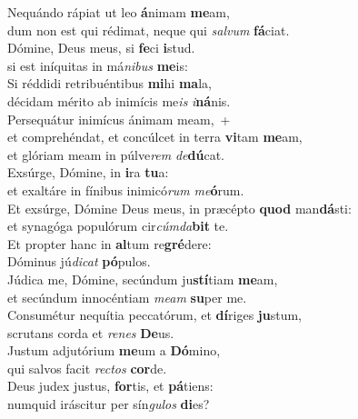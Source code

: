 \evenverse Nequándo rápiat ut leo \textbf{á}nimam \textbf{me}am,~\*\\
\evenverse dum non est qui rédimat, neque qui \textit{sal}\textit{vum} \textbf{fá}ciat.\\
\oddverse Dómine, Deus meus, si \textbf{fe}ci \textbf{i}stud.~\*\\
\oddverse si est iníquitas in má\textit{ni}\textit{bus} \textbf{me}is:\\
\evenverse Si réddidi retribuéntibus \textbf{mi}hi \textbf{ma}la,~\*\\
\evenverse décidam mérito ab inimícis me\textit{is} \textit{i}\textbf{ná}nis.\\
\oddverse Persequátur inimícus ánimam meam,~+\\
\oddverse  et comprehéndat, et concúlcet in terra \textbf{vi}tam \textbf{me}am,~\*\\
\oddverse et glóriam meam in púlve\textit{rem} \textit{de}\textbf{dú}cat.\\
\evenverse Exsúrge, Dómine, in \textbf{i}ra \textbf{tu}a:~\*\\
\evenverse et exaltáre in fínibus inimicó\textit{rum} \textit{me}\textbf{ó}rum.\\
\oddverse Et exsúrge, Dómine Deus meus, in præcépto \textbf{quod} man\textbf{dá}sti:~\*\\
\oddverse et synagóga populórum cir\textit{cúm}\textit{da}\textbf{bit} te.\\
\evenverse Et propter hanc in \textbf{al}tum re\textbf{gré}dere:~\*\\
\evenverse Dóminus jú\textit{di}\textit{cat} \textbf{pó}pulos.\\
\oddverse Júdica me, Dómine, secúndum ju\textbf{stí}tiam \textbf{me}am,~\*\\
\oddverse et secúndum innocéntiam \textit{me}\textit{am} \textbf{su}per me.\\
\evenverse Consumétur nequítia peccatórum, et \textbf{dí}riges \textbf{ju}stum,~\*\\
\evenverse scrutans corda et \textit{re}\textit{nes} \textbf{De}us.\\
\oddverse Justum adjutórium \textbf{me}um a \textbf{Dó}mino,~\*\\
\oddverse qui salvos facit \textit{re}\textit{ctos} \textbf{cor}de.\\
\evenverse Deus judex justus, \textbf{for}tis, et \textbf{pá}tiens:~\*\\
\evenverse numquid iráscitur per sín\textit{gu}\textit{los} \textbf{di}es?\\
